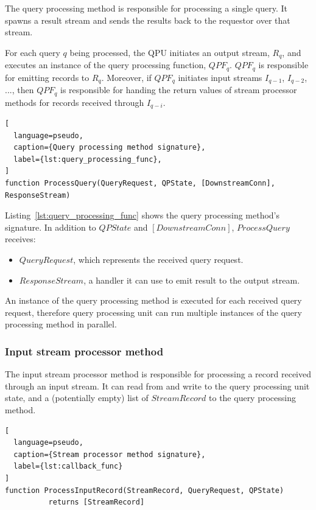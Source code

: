 The query processing method is responsible for processing a single query.
It spawns a result stream and sends the results back to the requestor over that stream.

For each query $q$ being processed, the QPU initiates an output stream, $R_q$,
and executes an instance of the query processing function, $QPF_q$.
$QPF_q$ is responsible for emitting records to $R_q$.
Moreover, if $QPF_q$ initiates input streams $I_{q-1}$, $I_{q-2}$, ..., then $QPF_q$ is responsible for handing the return
values of stream processor methods for records received through $I_{q-i}$.

\begin{lstlisting}[
  language=pseudo,
  caption={Query processing method signature},
  label={lst:query_processing_func},
]
function ProcessQuery(QueryRequest, QPState, [DownstreamConn], ResponseStream)
\end{lstlisting}

\noindent
Listing~\ref{lst:query_processing_func} shows the query processing method's signature.
In addition to $QPState$ and $[DownstreamConn]$, $ProcessQuery$ receives:

\begin{itemize}
  \item $QueryRequest$, which represents the received query request.

  \item $ResponseStream$, a handler it can use to emit result to the output stream.

\end{itemize}

An instance of the query processing method is executed for each received query request,
therefore query processing unit can run multiple instances of the query processing method in parallel.

\subsubsection{Input stream processor method}
\label{sec:callback_func}

The input stream processor method is responsible for processing a record received through an input stream.
It can read from and write to the query processing unit state,
and a (potentially empty) list of $StreamRecord$ to the query processing method.

\begin{lstlisting}[
  language=pseudo,
  caption={Stream processor method signature},
  label={lst:callback_func}
]
function ProcessInputRecord(StreamRecord, QueryRequest, QPState)
          returns [StreamRecord]
\end{lstlisting}

